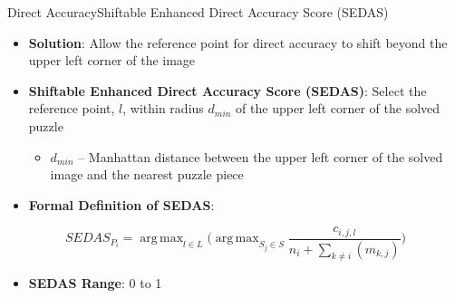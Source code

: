 \documentclass[10pt]{beamer}
\DeclareMathOperator*{\argmax}{arg\,max} %
\begin{document}
\begin{frame}{Direct Accuracy}{Shiftable Enhanced Direct Accuracy Score (SEDAS)}
  \begin{itemize}
    \item \textbf{Solution}: Allow the reference point for direct accuracy to shift beyond the upper left corner of the image
    \vfill
    \item \textbf{Shiftable Enhanced Direct Accuracy Score (SEDAS)}: Select the reference point, $l$, within radius $d_{min}$ of the upper left corner of the solved puzzle
    \begin{itemize}
      \vspace{0.6em}
      \item $d_{min}$ -- Manhattan distance between the upper left corner of the solved image and the nearest puzzle piece
    \end{itemize}
    \vfill
    \item \textbf{Formal Definition of SEDAS}:
  \end{itemize}
  \vfill  
  \begin{equation} \label{eq:shiftableEnhancedDirectAccuracyScore}
    SEDAS_{P_i} = \argmax_{l \in L} \bigg( \argmax_{S_j \in S}\frac{c_{i,j,l}}{n_i + \sum_{k \ne i}(m_{k,j})} \bigg)
  \end{equation}
  \vspace{-1em}
  \vfill
  \begin{itemize}
    \item \textbf{SEDAS Range}: 0 to 1
  \end{itemize}
\end{frame}
\end{document}
